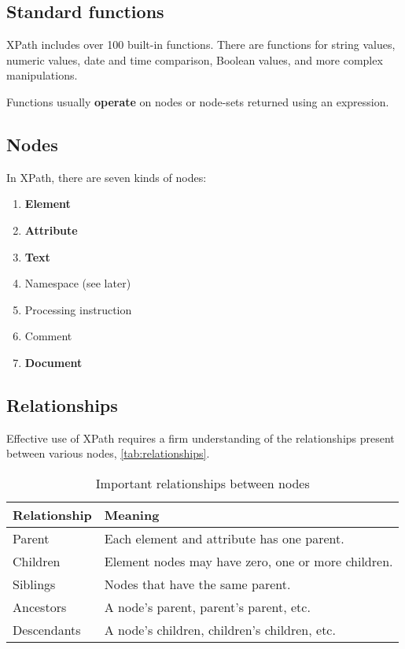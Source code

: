 \documentclass[slides]{pgnotes}
\begin{document}
\subsection{Standard functions}

XPath includes over 100 built-in functions.
There are functions for string values, numeric values, date and time comparison, Boolean values, and more complex manipulations.
  
Functions usually \textbf{operate} on nodes or node-sets returned using an expression. 


\subsection{Nodes}

In XPath, there are seven kinds of nodes:

\begin{enumerate}
\item \textbf{Element}
\item \textbf{Attribute}
\item \textbf{Text}
\item Namespace (see later)
\item Processing instruction 
\item Comment
\item \textbf{Document}
\end{enumerate}


\subsection{Relationships}

Effective use of XPath requires a firm understanding of the relationships present between various nodes, \autoref{tab:relationships}.

\begin{table}[htbp]
  \centering
  \begin{tabularx}{1.0\linewidth}{l X}
    \toprule
    \textbf{Relationship} & \textbf{Meaning} \\
    \midrule
    Parent & Each element and attribute has one parent. \\
    Children & Element nodes may have zero, one or more children. \\
    Siblings & Nodes that have the same parent. \\
    Ancestors & A node's parent, parent's parent, etc. \\
    Descendants & A node's children, children's children, etc. \\
    \bottomrule
  \end{tabularx}
  \caption{Important relationships between nodes}
  \label{tab:relationships} 
\end{table}
\end{document}
